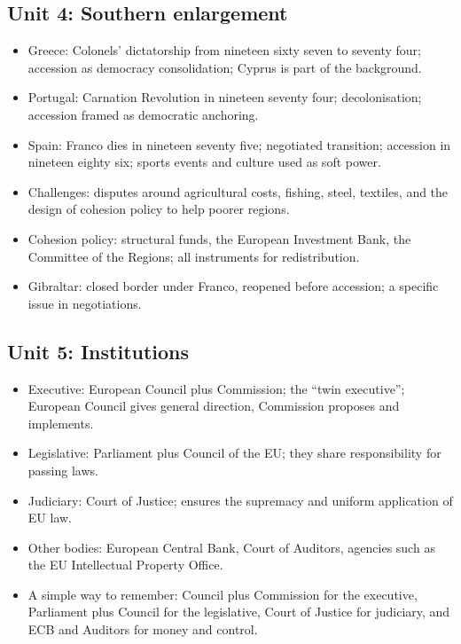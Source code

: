 \documentclass[10pt,a4paper]{article}
\begin{document}
\subsection*{Unit 4: Southern enlargement}
\begin{itemize}
\item Greece: Colonels’ dictatorship from nineteen sixty seven to seventy four; accession as democracy consolidation; Cyprus is part of the background.
\item Portugal: Carnation Revolution in nineteen seventy four; decolonisation; accession framed as democratic anchoring.
\item Spain: Franco dies in nineteen seventy five; negotiated transition; accession in nineteen eighty six; sports events and culture used as soft power.
\item Challenges: disputes around agricultural costs, fishing, steel, textiles, and the design of cohesion policy to help poorer regions.
\item Cohesion policy: structural funds, the European Investment Bank, the Committee of the Regions; all instruments for redistribution.
\item Gibraltar: closed border under Franco, reopened before accession; a specific issue in negotiations.
\end{itemize}

\subsection*{Unit 5: Institutions}
\begin{itemize}
\item Executive: European Council plus Commission; the “twin executive”; European Council gives general direction, Commission proposes and implements.
\item Legislative: Parliament plus Council of the EU; they share responsibility for passing laws.
\item Judiciary: Court of Justice; ensures the supremacy and uniform application of EU law.
\item Other bodies: European Central Bank, Court of Auditors, agencies such as the EU Intellectual Property Office.
\item A simple way to remember: Council plus Commission for the executive, Parliament plus Council for the legislative, Court of Justice for judiciary, and ECB and Auditors for money and control.
\end{itemize}
\end{document}
